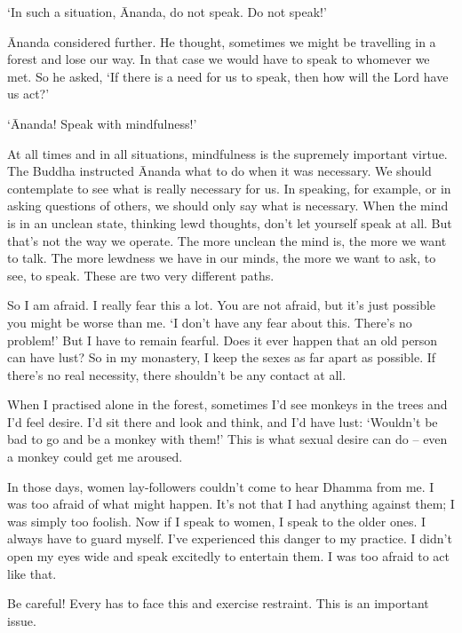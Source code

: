`In such a situation, \=Ananda, do not speak. Do not speak!'

\=Ananda considered further. He thought, sometimes we might be travelling in a forest and lose our way. In that case we would have to speak to whomever we met. So he asked, `If there is a need for us to speak, then how will the Lord have us act?'

`\=Ananda! Speak with mindfulness!'

At all times and in all situations, mindfulness is the supremely important virtue. The Buddha instructed \=Ananda what to do when it was necessary. We should contemplate to see what is really necessary for us. In speaking, for example, or in asking questions of others, we should only say what is necessary. When the mind is in an unclean state, thinking lewd thoughts, don't let yourself speak at all. But that's not the way we operate. The more unclean the mind is, the more we want to talk. The more lewdness we have in our minds, the more we want to ask, to see, to speak. These are two very different paths.

So I am afraid. I really fear this a lot. You are not afraid, but it's just possible you might be worse than me. `I don't have any fear about this. There's no problem!' But I have to remain fearful. Does it ever happen that an old person can have lust? So in my monastery, I keep the sexes as far apart as possible. If there's no real necessity, there shouldn't be any contact at all.

When I practised alone in the forest, sometimes I'd see monkeys in the trees and I'd feel desire. I'd sit there and look and think, and I'd have lust: `Wouldn't be bad to go and be a monkey with them!' This is what sexual desire can do -- even a monkey could get me aroused.

In those days, women lay-followers couldn't come to hear Dhamma from me. I was too afraid of what might happen. It's not that I had anything against them; I was simply too foolish. Now if I speak to women, I speak to the older ones. I always have to guard myself. I've experienced this danger to my practice. I didn't open my eyes wide and speak excitedly to entertain them. I was too afraid to act like that.

Be careful! Every  has to face this and exercise restraint. This is an important issue.

